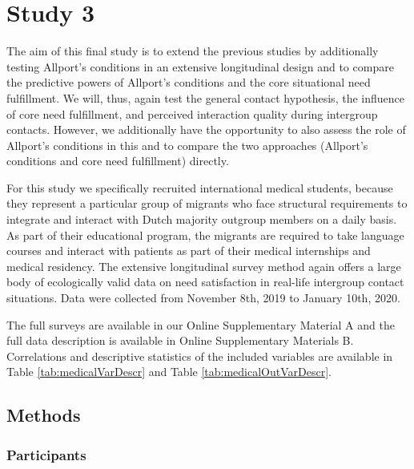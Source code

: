 \section{Study 3}

The aim of this final study is to extend the previous studies by
additionally testing Allport's conditions in an extensive longitudinal
design and to compare the predictive powers of Allport's conditions and
the core situational need fulfillment. We will, thus, again test the
general contact hypothesis, the influence of core need fulfillment, and
perceived interaction quality during intergroup contacts. However, we
additionally have the opportunity to also assess the role of Allport's
conditions in this and to compare the two approaches (Allport's
conditions and core need fulfillment) directly.

For this study we specifically recruited international medical students,
because they represent a particular group of migrants who face
structural requirements to integrate and interact with Dutch majority
outgroup members on a daily basis. As part of their educational program,
the migrants are required to take language courses and interact with
patients as part of their medical internships and medical residency. The
extensive longitudinal survey method again offers a large body of
ecologically valid data on need satisfaction in real-life intergroup
contact situations. Data were collected from November 8th, 2019 to
January 10th, 2020.

The full surveys are available in our Online Supplementary Material A
and the full data description is available in Online Supplementary
Materials B. Correlations and descriptive statistics of the included
variables are available in Table \ref{tab:medicalVarDescr} and Table
\ref{tab:medicalOutVarDescr}.

\subsection{Methods}

\subsubsection{Participants}


